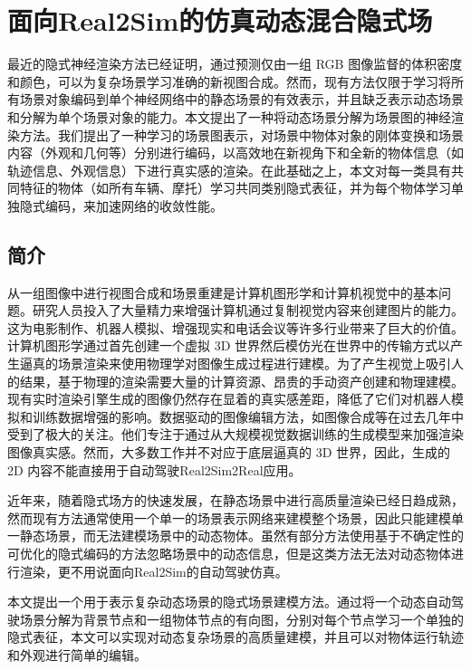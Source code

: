 \chapter{面向Real2Sim的仿真动态混合隐式场}
最近的隐式神经渲染方法已经证明，通过预测仅由一组 RGB 图像监督的体积密度和颜色，可以为复杂场景学习准确的新视图合成。然而，现有方法仅限于学习将所有场景对象编码到单个神经网络中的静态场景的有效表示，并且缺乏表示动态场景和分解为单个场景对象的能力。本文提出了一种将动态场景分解为场景图的神经渲染方法。我们提出了一种学习的场景图表示，对场景中物体对象的刚体变换和场景内容（外观和几何等）分别进行编码，以高效地在新视角下和全新的物体信息（如轨迹信息、外观信息）下进行真实感的渲染。在此基础之上，本文对每一类具有共同特征的物体（如所有车辆、摩托）学习共同类别隐式表征，并为每个物体学习单独隐式编码，来加速网络的收敛性能。

\section{简介}

从一组图像中进行视图合成和场景重建是计算机图形学和计算机视觉中的基本问题。研究人员投入了大量精力来增强计算机通过复制视觉内容来创建图片的能力。这为电影制作、机器人模拟、增强现实和电话会议等许多行业带来了巨大的价值。计算机图形学通过首先创建一个虚拟 3D 世界然后模仿光在世界中的传输方式以产生逼真的场景渲染来使用物理学对图像生成过程进行建模。为了产生视觉上吸引人的结果，基于物理的渲染需要大量的计算资源、昂贵的手动资产创建和物理建模。现有实时渲染引擎生成的图像仍然存在显着的真实感差距，降低了它们对机器人模拟和训练数据增强的影响。数据驱动的图像编辑方法，如图像合成等在过去几年中受到了极大的关注。他们专注于通过从大规模视觉数据训练的生成模型来加强渲染图像真实感。然而，大多数工作并不对应于底层逼真的 3D 世界，因此，生成的 2D 内容不能直接用于自动驾驶Real2Sim2Real应用。

近年来，随着隐式场方\cite{mildenhall_nerf_2020, barron_mip-nerf_2022, muller_instant_2022}的快速发展，在静态场景中进行高质量渲染已经日趋成熟，然而现有方法通常使用一个单一的场景表示网络来建模整个场景，因此只能建模单一静态场景，而无法建模场景中的动态物体。虽然有部分方法使用基于不确定性的可优化的隐式编码的方法忽略场景中的动态信息\cite{martin-brualla_nerf_2021}，但是这类方法无法对动态物体进行渲染，更不用说面向Real2Sim的自动驾驶仿真。

本文提出一个用于表示复杂动态场景的隐式场景建模方法。通过将一个动态自动驾驶场景分解为背景节点和一组物体节点的有向图，分别对每个节点学习一个单独的隐式表征，本文可以实现对动态复杂场景的高质量建模，并且可以对物体运行轨迹和外观进行简单的编辑。

